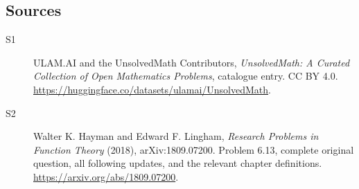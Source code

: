 \documentclass[11pt]{book}
\begin{document}
\subsection{Sources}
\begin{description}
\item[\hypertarget{source:statement:1}{S1}] ULAM.AI and the UnsolvedMath Contributors, \emph{UnsolvedMath: A Curated Collection of Open Mathematics Problems}, catalogue entry. CC BY 4.0. \url{https://huggingface.co/datasets/ulamai/UnsolvedMath}.
\item[\hypertarget{source:statement:2}{S2}] Walter K. Hayman and Edward F. Lingham, \emph{Research Problems in Function Theory} (2018), arXiv:1809.07200. Problem 6.13, complete original question, all following updates, and the relevant chapter definitions. \url{https://arxiv.org/abs/1809.07200}.
\end{description}
\label{end:statement}
\end{document}
